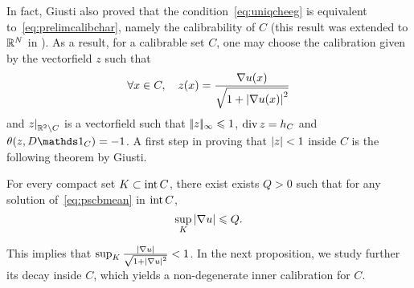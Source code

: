 In fact, Giusti also proved that the condition~\eqref{eq:uniqcheeg} is equivalent to~\eqref{eq:prelimcalibchar}, namely the calibrability of $C$ (this result was extended to $\mathbb{R}^N$ in \cite{alteruniq09}). As a result, for a calibrable set $C$, one may choose the calibration given by the vectorfield $z$ such that
\begin{equation*}
  \forall x\in C,\quad  z(x)=\frac{\nabla u(x)}{\sqrt{1+\left| \nabla u(x) \right|^2}}
\end{equation*}
and ${z\vert}_{\mathbb{R}^2\setminus C}$ is a vectorfield such that $|\!| z |\!|_{\infty}\leqslant 1$, $\operatorname{div} z=h_C$ and $\theta(z,D\bun{C})=-1$.
A first step in proving that $\left| z \right|<1$ inside $C$ is the following theorem by Giusti.
\begin{thm}\label{thm:giustibounded}
  For every compact set $K\subset \operatorname{int}{C}$, there exist exists $Q>0$ such that for any solution of~\eqref{eq:pscbmean} in $\operatorname{int}{C}$, 
  \begin{equation*}
    \sup_K\left| \nabla u \right|\leqslant Q.
  \end{equation*}
\end{thm}
This implies that $\sup_{K}\frac{\left| \nabla u \right|}{\sqrt{1+\left| \nabla u \right|^2}}<1$. In the next proposition, we study further its decay  inside $C$, which yields a non-degenerate inner calibration for $C$.

